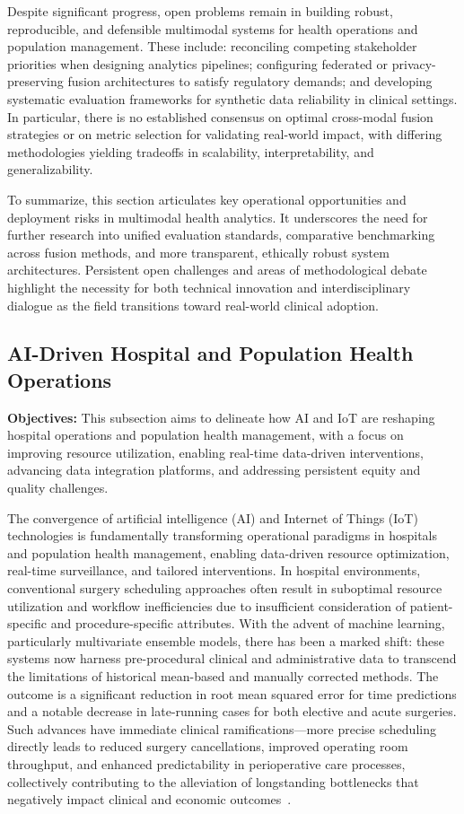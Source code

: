 \documentclass[sigconf]{acmart}
\begin{document}
Despite significant progress, open problems remain in building robust, reproducible, and defensible multimodal systems for health operations and population management. These include: reconciling competing stakeholder priorities when designing analytics pipelines; configuring federated or privacy-preserving fusion architectures to satisfy regulatory demands; and developing systematic evaluation frameworks for synthetic data reliability in clinical settings. In particular, there is no established consensus on optimal cross-modal fusion strategies or on metric selection for validating real-world impact, with differing methodologies yielding tradeoffs in scalability, interpretability, and generalizability.

To summarize, this section articulates key operational opportunities and deployment risks in multimodal health analytics. It underscores the need for further research into unified evaluation standards, comparative benchmarking across fusion methods, and more transparent, ethically robust system architectures. Persistent open challenges and areas of methodological debate highlight the necessity for both technical innovation and interdisciplinary dialogue as the field transitions toward real-world clinical adoption.

\subsection{AI-Driven Hospital and Population Health Operations}

\textbf{Objectives:} This subsection aims to delineate how AI and IoT are reshaping hospital operations and population health management, with a focus on improving resource utilization, enabling real-time data-driven interventions, advancing data integration platforms, and addressing persistent equity and quality challenges.

The convergence of artificial intelligence (AI) and Internet of Things (IoT) technologies is fundamentally transforming operational paradigms in hospitals and population health management, enabling data-driven resource optimization, real-time surveillance, and tailored interventions. In hospital environments, conventional surgery scheduling approaches often result in suboptimal resource utilization and workflow inefficiencies due to insufficient consideration of patient-specific and procedure-specific attributes. With the advent of machine learning, particularly multivariate ensemble models, there has been a marked shift: these systems now harness pre-procedural clinical and administrative data to transcend the limitations of historical mean-based and manually corrected methods. The outcome is a significant reduction in root mean squared error for time predictions and a notable decrease in late-running cases for both elective and acute surgeries. Such advances have immediate clinical ramifications—more precise scheduling directly leads to reduced surgery cancellations, improved operating room throughput, and enhanced predictability in perioperative care processes, collectively contributing to the alleviation of longstanding bottlenecks that negatively impact clinical and economic outcomes~\cite{ref81}.
\end{document}
